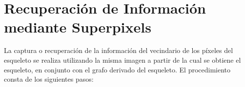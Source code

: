 \label{chap:apendice}

\section{Recuperaci\'on de Informaci\'on mediante Superpixels}
\label{sec:superpixels}

La captura o recuperaci\'on de la informaci\'on del vecindario de los p\'ixeles del esqueleto se realiza utilizando la misma imagen a partir de la cual se obtiene el esqueleto, en conjunto con el grafo derivado del esqueleto. El procedimiento consta de los siguientes pasos:



